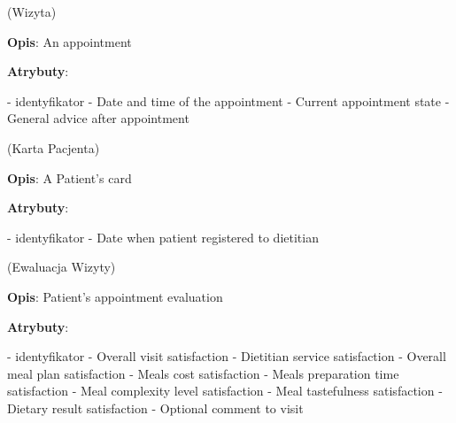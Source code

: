 \begin{enumerate}[label={\textbf{KAT/\protect\threedigits{\theenumi}}}, wide, labelwidth=!, labelindent=0pt, labelsep=0pt, series=reqs]
     \label{kat:Appointment} (Wizyta)

    \textbf{Opis}: An appointment
    \par
    \textbf{Atrybuty}:
    \begin{itemize}[series=atr, wide, align=left, leftmargin=190pt]
         \label{kat:Appointment:id} - identyfikator
         \label{kat:Appointment:appointmentDate} - Date and time of the appointment
         \label{kat:Appointment:appointmentState} - Current appointment state
         \label{kat:Appointment:generalAdvice} - General advice after appointment
    \end{itemize}

     \label{kat:PatientCard} (Karta Pacjenta)

    \textbf{Opis}: A Patient's card
    \par
    \textbf{Atrybuty}:
    \begin{itemize}[series=atr, wide, align=left, leftmargin=190pt]
         \label{kat:PatientCard:id} - identyfikator
         \label{kat:PatientCard:creationDate} - Date when patient registered to dietitian
    \end{itemize}

     \label{kat:AppointmentEvaluation} (Ewaluacja Wizyty)

    \textbf{Opis}: Patient's appointment evaluation
    \par
    \textbf{Atrybuty}:
    \begin{itemize}[series=atr, wide, align=left, leftmargin=190pt]
         \label{kat:AppointmentEvaluation:id} - identyfikator
         \label{kat:AppointmentEvaluation:overallSatisfaction} - Overall visit satisfaction
         \label{kat:AppointmentEvaluation:dietitianServiceSatisfaction} - Dietitian service satisfaction
         \label{kat:AppointmentEvaluation:mealPlanOverallSatisfaction} - Overall meal plan satisfaction
         \label{kat:AppointmentEvaluation:mealCostSatisfaction} - Meals cost satisfaction
         \label{kat:AppointmentEvaluation:mealPreparationTimeSatisfaction} - Meals preparation time satisfaction
         \label{kat:AppointmentEvaluation:mealComplexityLevelSatisfaction} - Meal complexity level satisfaction
         \label{kat:AppointmentEvaluation:mealTastefulnessSatisfaction} - Meal tastefulness satisfaction
         \label{kat:AppointmentEvaluation:dietaryResultSatisfaction} - Dietary result satisfaction
         \label{kat:AppointmentEvaluation:comment} - Optional comment to visit
    \end{itemize}


\end{enumerate}
